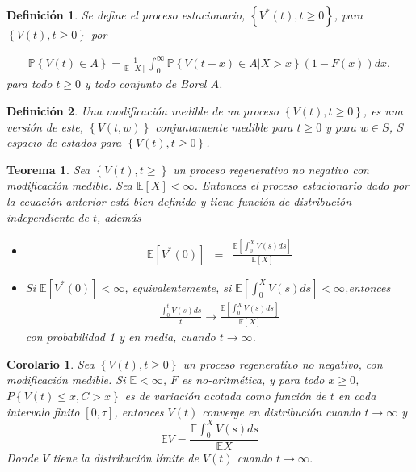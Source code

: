 \documentclass{article}
\newtheorem{Def}{Definición}[section]
\newtheorem{Teo}{Teorema}[section]
\newtheorem{Cor}{Corolario}[section]
\newcommand{\esp}{\mathbb{E}}
\newcommand{\prob}{\mathbb{P}}
\numberwithin{equation}{section}
\begin{document}
\begin{Def}
Se define el proceso estacionario, $\left\{V^{*}\left(t\right),t\geq0\right\}$, para $\left\{V\left(t\right),t\geq0\right\}$ por

\begin{eqnarray}
\prob\left\{V\left(t\right)\in A\right\}=\frac{1}{\esp\left[X\right]}\int_{0}^{\infty}\prob\left\{V\left(t+x\right)\in A|X>x\right\}\left(1-F\left(x\right)\right)dx,
\end{eqnarray} 
para todo $t\geq0$ y todo conjunto de Borel $A$.
\end{Def}

\begin{Def}
Una modificaci\'on medible de un proceso $\left\{V\left(t\right),t\geq0\right\}$, es una versi\'on de este, $\left\{V\left(t,w\right)\right\}$ conjuntamente medible para $t\geq0$ y para $w\in S$, $S$ espacio de estados para $\left\{V\left(t\right),t\geq0\right\}$.
\end{Def}

\begin{Teo}
Sea $\left\{V\left(t\right),t\geq\right\}$ un proceso regenerativo no negativo con modificaci\'on medible. Sea $\esp\left[X\right]<\infty$. Entonces el proceso estacionario dado por la ecuaci\'on anterior est\'a bien definido y tiene funci\'on de distribuci\'on independiente de $t$, adem\'as
\begin{itemize}
\item[i)] \begin{eqnarray*}
\esp\left[V^{*}\left(0\right)\right]&=&\frac{\esp\left[\int_{0}^{X}V\left(s\right)ds\right]}{\esp\left[X\right]}\end{eqnarray*}
\item[ii)] Si $\esp\left[V^{*}\left(0\right)\right]<\infty$, equivalentemente, si $\esp\left[\int_{0}^{X}V\left(s\right)ds\right]<\infty$,entonces
\begin{eqnarray*}
\frac{\int_{0}^{t}V\left(s\right)ds}{t}\rightarrow\frac{\esp\left[\int_{0}^{X}V\left(s\right)ds\right]}{\esp\left[X\right]}
\end{eqnarray*}
con probabilidad 1 y en media, cuando $t\rightarrow\infty$.
\end{itemize}
\end{Teo}


\begin{Cor}
Sea $\left\{V\left(t\right),t\geq0\right\}$ un proceso regenerativo no negativo, con modificaci\'on medible. Si $\esp <\infty$, $F$ es no-aritm\'etica, y para todo $x\geq0$, $P\left\{V\left(t\right)\leq x,C>x\right\}$ es de variaci\'on acotada como funci\'on de $t$ en cada intervalo finito $\left[0,\tau\right]$, entonces $V\left(t\right)$ converge en distribuci\'on  cuando $t\rightarrow\infty$ y $$\esp V=\frac{\esp \int_{0}^{X}V\left(s\right)ds}{\esp X}$$
Donde $V$ tiene la distribuci\'on l\'imite de $V\left(t\right)$ cuando $t\rightarrow\infty$.

\end{Cor}
\end{document}
